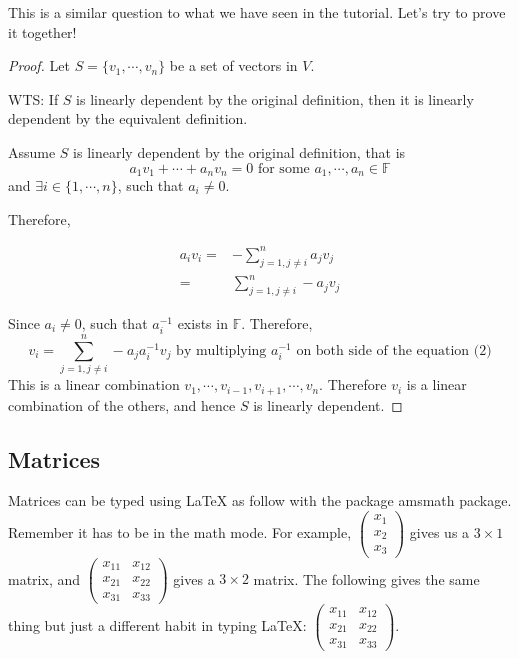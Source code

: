 \documentclass{article}
\newcommand{\Sum}{\displaystyle\sum} %
\begin{document}
This is a similar question to what we have seen in the tutorial. Let's try to prove it together!

\begin{proof} %
Let $S = \{ v_1, \cdots, v_n \}$ be a set of vectors in $V$.

WTS: If $S$ is linearly dependent by the original definition, then it is linearly dependent by the equivalent definition.

Assume $S$ is linearly dependent by the original definition, that is
$$
a_1 v_1 + \cdots + a_n v_n = 0 \text{ for some } a_1, \cdots, a_n \in \mathbb{F}
$$
and $\exists i \in \{ 1, \cdots, n\}$, such that $a_i \neq 0$.

Therefore,

\begin{align} %
    a_i v_i =& - \Sum_{j=1, j \neq i}^{n} a_j v_j \\
            =& \Sum_{j=1, j \neq i}^{n} -a_j v_j
\end{align}


Since $a_i \neq 0$, such that $a_i^{-1}$ exists in $\mathbb{F}$. Therefore,
$$
v_i = \Sum_{j=1, j \neq i}^{n} -a_j a_i^{-1} v_j \text{ by multiplying } a_i^{-1} \text{ on both side of the equation (2)}
$$
This is a linear combination $v_1, \cdots, v_{i-1}, v_{i+1}, \cdots, v_n$. Therefore $v_i$ is a linear combination of the others, and hence $S$ is linearly dependent.
\end{proof}

\subsection{Matrices}

Matrices can be typed using LaTeX as follow with the package amsmath package. Remember it has to be in the math mode. For example,
$
\begin{pmatrix}
x_1 \\ x_2 \\ x_3
\end{pmatrix}
$
gives us a $3 \times 1$ matrix, and
$
\begin{pmatrix}
x_{11} & x_{12} \\ x_{21} & x_{22} \\ x_{31} & x_{33}
\end{pmatrix}
$
gives a $3 \times 2$ matrix. The following gives the same thing but just a different habit in typing LaTeX:
$
\begin{pmatrix}
x_{11} & x_{12} \\
x_{21} & x_{22} \\
x_{31} & x_{33}
\end{pmatrix}
$.
\end{document}
